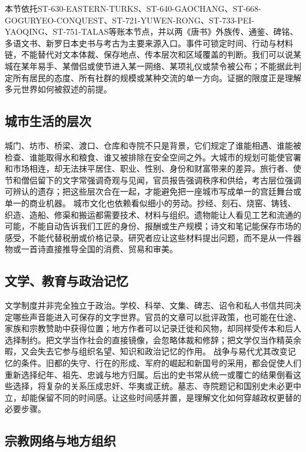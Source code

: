 本节依托ST-630-EASTERN-TURKS、ST-640-GAOCHANG、ST-668-GOGURYEO-CONQUEST、ST-721-YUWEN-RONG、ST-733-PEI-YAOQING、ST-751-TALAS等账本节点，并以两《唐书》外族传、通鉴、碑铭、多语文书、新罗日本史书与考古为主要来源入口。事件可锁定时间、行动与材料链，不能替代对文本体裁、保存地点、传本层次和区域覆盖的判断。我们可以说某城在某年易手、某僧侣或使节进入某一网络、某项礼仪或禁令被公布；不能据此判定所有居民的态度、所有社群的规模或某种交流的单一方向。证据的限度正是理解多元世界如何被叙述的前提。  \subsection{城市生活的层次} 城门、坊市、桥梁、渡口、仓库和寺院不只是背景，它们规定了谁能相遇、谁能被检查、谁能取得水和粮食、谁又被排除在安全空间之外。大城市的规划可能使官署和市场相连，却无法抹平居住、职业、性别、身份和财富带来的差异。旅行者、使节和僧侣留下的文字常强调奇观与见闻，官员报告强调秩序和供给，考古层位强调可辨认的遗存；把这些层次合在一起，才能避免把一座城市写成单一的宫廷舞台或单一的商业机器。  城市文化也依赖看似细小的劳动。抄经、刻石、烧窑、铸钱、织造、造船、修渠和搬运都需要技术、材料与组织。遗物能让人看见工艺和流通的可能，不能自动告诉我们工匠的身份、报酬或生产规模；诗文和笔记能保存市场的感受，不能代替税册或价格记录。研究者应让这些材料提出问题，而不是从一件器物或一首诗直接推导全国的消费、贸易和审美。  \subsection{文学、教育与政治记忆} 文学制度并非完全独立于政治。学校、科举、文集、碑志、诏令和私人书信共同决定哪些声音能进入可保存的文字世界。官员的文章可以批评政策，也可能在仕途、家族和宗教赞助中获得位置；地方作者可以记录迁徙和风物，却同样受传本和后人选择制约。把文学当作社会的直接镜像，会忽略体裁和修辞；把文学仅当作精英余暇，又会失去它参与组织名望、知识和政治记忆的作用。  战争与易代尤其改变记忆的条件。旧都的失守、行在的形成、军府的崛起和新国号的采用，都会促使人们重新选择纪年、祖先、忠诚与地方归属。后出的史书常从统一或覆亡的结果倒看这些选择，将复杂的关系压成忠奸、华夷或正统。墓志、寺院题记和国别史未必更中立，却能保留不同的时间感。让这些时间感并置，是理解文化如何穿越政权更替的必要步骤。  \subsection{宗教网络与地方组织} 